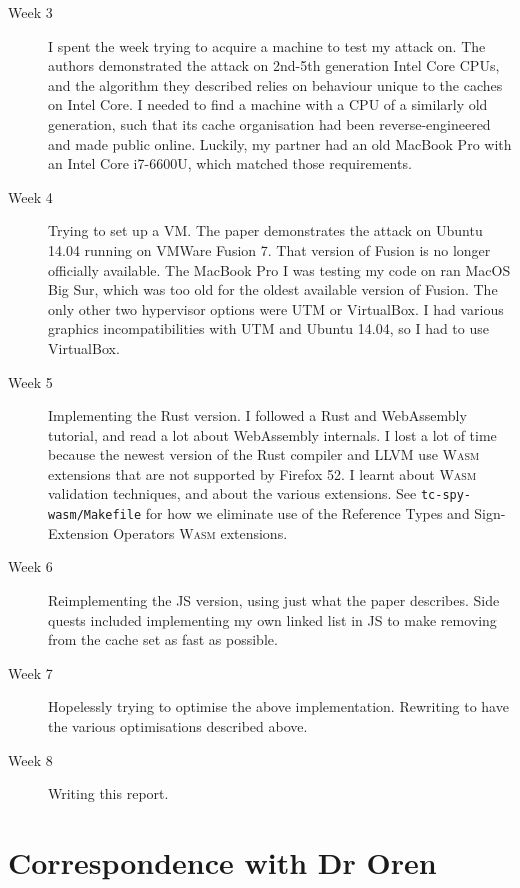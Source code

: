 \documentclass[a4paper,10pt,twocolumn]{article}
\theoremstyle{definition}
\newcommand*{\code}{\texttt}
\newcommand*{\acronym}{\textsc}
\newcommand*{\WASM}{\acronym{Wasm}}
\begin{document}
\begin{description}
\item[Week 3]
  I spent the week trying to acquire a machine to test my attack on.
  The authors demonstrated the attack on 2nd-5th generation Intel Core
  CPUs, and the algorithm they described relies on behaviour unique to the
  caches on Intel Core.
  I needed to find a machine with a CPU of a similarly old generation, such that
  its cache organisation had been reverse-engineered and made public online.
  Luckily, my partner had an old MacBook Pro with an Intel Core i7-6600U, which
  matched those requirements.
\item[Week 4]
  Trying to set up a VM.
  The paper demonstrates the attack on Ubuntu 14.04 running on VMWare Fusion 7.
  That version of Fusion is no longer officially available.
  The MacBook Pro I was testing my code on ran MacOS Big Sur, which was too old
  for the oldest available version of Fusion.
  The only other two hypervisor options were UTM or VirtualBox.
  I had various graphics incompatibilities with UTM and Ubuntu 14.04, so I had
  to use VirtualBox.
\item[Week 5]
  Implementing the Rust version.
  I followed a Rust and WebAssembly tutorial, and read a lot about WebAssembly
  internals.
  I lost a lot of time because the newest version of the Rust compiler and LLVM
  use \WASM{} extensions that are not supported by Firefox 52.
  I learnt about \WASM{} validation techniques, and about the various
  extensions.
  See \code{tc-spy-wasm/Makefile} for how we eliminate use of the Reference
  Types and Sign-Extension Operators \WASM{} extensions.
\item[Week 6]
  Reimplementing the JS version, using just what the paper describes.
  Side quests included implementing my own linked list in JS to make removing
  from the cache set as fast as possible.
\item [Week 7]
  Hopelessly trying to optimise the above implementation.
  Rewriting to have the various optimisations described above.
\item [Week 8]
  Writing this report.
\end{description}

\newpage
\section{Correspondence with Dr Oren}
\end{document}
